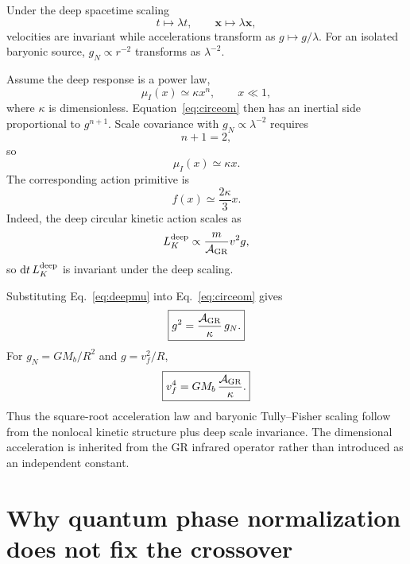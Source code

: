 \documentclass[11pt]{article}
\begin{document}
Under the deep spacetime scaling
\begin{equation}
    t\mapsto\lambda t,
    \qquad
    \bm x\mapsto\lambda\bm x,
\end{equation}
velocities are invariant while accelerations transform as $g\mapsto g/\lambda$. For an isolated baryonic source, $g_N\propto r^{-2}$ transforms as $\lambda^{-2}$.

Assume the deep response is a power law,
\begin{equation}
    \mu_I(x)\simeq \kappa x^n,
    \qquad x\ll1,
\end{equation}
where $\kappa$ is dimensionless. Equation~\eqref{eq:circeom} then has an inertial side proportional to $g^{n+1}$. Scale covariance with $g_N\propto\lambda^{-2}$ requires
\begin{equation}
    n+1=2,
\end{equation}
so
\begin{equation}
    \boxed{\mu_I(x)\simeq\kappa x.}
    \label{eq:deepmu}
\end{equation}
The corresponding action primitive is
\begin{equation}
    \boxed{f(x)\simeq\frac{2\kappa}{3}x.}
    \label{eq:deepf}
\end{equation}
Indeed, the deep circular kinetic action scales as
\begin{equation}
    L_K^{\rm deep}\propto \frac{m}{\mathcal A_{\rm GR}}v^2g,
\end{equation}
so $\dd t\,L_K^{\rm deep}$ is invariant under the deep scaling.

Substituting Eq.~\eqref{eq:deepmu} into Eq.~\eqref{eq:circeom} gives
\begin{equation}
    \boxed{
    g^2=\frac{\mathcal A_{\rm GR}}{\kappa}\,g_N.
    }
    \label{eq:sqrtlaw}
\end{equation}
For $g_N=GM_b/R^2$ and $g=v_f^2/R$,
\begin{equation}
    \boxed{
    v_f^4=G M_b\,\frac{\mathcal A_{\rm GR}}{\kappa}.
    }
    \label{eq:BTFR}
\end{equation}
Thus the square-root acceleration law and baryonic Tully--Fisher scaling follow from the nonlocal kinetic structure plus deep scale invariance. The dimensional acceleration is inherited from the GR infrared operator rather than introduced as an independent constant.

\section{Why quantum phase normalization does not fix the crossover}
\end{document}
